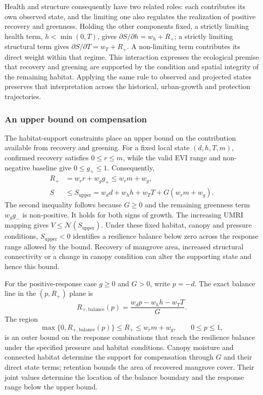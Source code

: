 Health and structure consequently have two related roles: each contributes its own observed state, and the limiting one also regulates the realization of positive recovery and greenness. Holding the other components fixed, a strictly limiting health term, $h<\min(0,T)$, gives $\partial S/\partial h=w_h+R_+$; a strictly limiting structural term gives $\partial S/\partial T=w_T+R_+$. A non-limiting term contributes its direct weight within that regime. This interaction expresses the ecological premise that recovery and greening are supported by the condition and spatial integrity of the remaining habitat. Applying the same rule to observed and projected states preserves that interpretation across the historical, urban-growth and protection trajectories.

\subsubsection{An upper bound on compensation}

The habitat-support constraints place an upper bound on the contribution available from recovery and greening. For a fixed local state $(d,h,T,m)$, confirmed recovery satisfies $0\leq r\leq m$, while the valid EVI range and non-negative baseline give $0\leq g_+\leq1$. Consequently,
\[
\begin{aligned}
R_+&=w_rr+w_gg_+\leq w_rm+w_g,\\
S&\leq S_{\mathrm{upper}}
=w_dd+w_hh+w_TT+G(w_rm+w_g).
\end{aligned}
\]
The second inequality follows because $G\geq0$ and the remaining greenness term $w_gg_-$ is non-positive. It holds for both signs of growth. The increasing UMRI mapping gives $V\leq\mathcal{N}(S_{\mathrm{upper}})$. Under these fixed habitat, canopy and pressure conditions, $S_{\mathrm{upper}}<0$ identifies a resilience balance below zero across the response range allowed by the bound. Recovery of mangrove area, increased structural connectivity or a change in canopy condition can alter the supporting state and hence this bound.

For the positive-response case $g\geq0$ and $G>0$, write $p=-d$. The exact balance line in the $(p,R_+)$ plane is
\[
R_{+,\mathrm{balance}}(p)=\frac{w_dp-w_hh-w_TT}{G}.
\]
The region
\[
\max\{0,R_{+,\mathrm{balance}}(p)\}\leq R_+\leq w_rm+w_g,
\qquad 0\leq p\leq1,
\]
is an outer bound on the response combinations that reach the resilience balance under the specified pressure and habitat conditions. Canopy moisture and connected habitat determine the support for compensation through $G$ and their direct state terms; retention bounds the area of recovered mangrove cover. Their joint values determine the location of the balance boundary and the response range below the upper bound.

